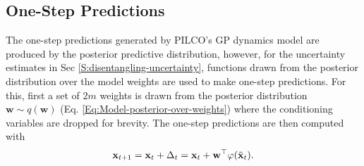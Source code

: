 \subsection{One-Step Predictions}
\label{S:one-step-predictions}
The one-step predictions generated by PILCO's GP dynamics model are produced by the posterior predictive distribution, however, for the uncertainty estimates in Sec \ref{S:disentangling-uncertainty}, functions drawn from the posterior distribution over the model weights are used to make one-step predictions. For this, first a set of $2m$ weights is drawn from the posterior distribution $\mathbf{w} \sim q(\mathbf{w})$ (Eq. \ref{Eq:Model-posterior-over-weights}) where the conditioning variables are dropped for brevity. The one-step predictions are then computed with
\begin{equation}
    \mathbf{x}_{t+1}
    = \mathbf{x}_{t} + \Delta_{t} \\
    =\mathbf{x}_{t}+\mathbf{w}^{\top}\varphi(\tilde{\mathbf{x}}_{t}).
    \label{Eq:model-posterior-one-step}
\end{equation}

